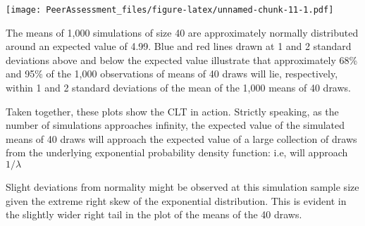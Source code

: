 \documentclass[]{article}
\begin{document}
\texttt{[image: PeerAssessment\_files/figure-latex/unnamed-chunk-11-1.pdf]}

The means of 1,000 simulations of size 40 are approximately normally
distributed around an expected value of 4.99. Blue and red lines drawn
at 1 and 2 standard deviations above and below the expected value
illustrate that approximately 68\% and 95\% of the 1,000 observations of
means of 40 draws will lie, respectively, within 1 and 2 standard
deviations of the mean of the 1,000 means of 40 draws.

Taken together, these plots show the CLT in action. Strictly speaking,
as the number of simulations approaches infinity, the expected value of
the simulated means of 40 draws will approach the expected value of a
large collection of draws from the underlying exponential probability
density function: i.e, will approach \(1/\lambda\)

Slight deviations from normality might be observed at this simulation
sample size given the extreme right skew of the exponential
distribution. This is evident in the slightly wider right tail in the
plot of the means of the 40 draws.
\end{document}
